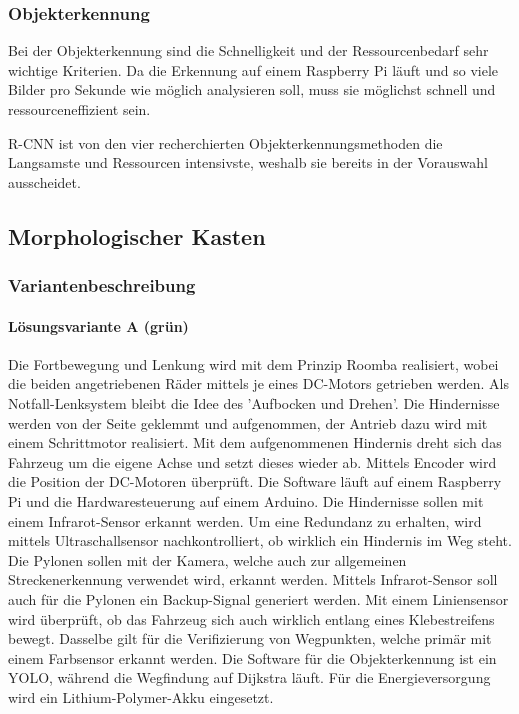 \documentclass[../main.tex]{subfiles}
\begin{document}
\subsubsection{Objekterkennung}

Bei der Objekterkennung sind die Schnelligkeit und der Ressourcenbedarf sehr wichtige Kriterien.
Da die Erkennung auf einem Raspberry Pi läuft und so viele Bilder pro Sekunde wie möglich analysieren soll, muss sie möglichst schnell und ressourceneffizient sein. 

R-CNN ist von den vier recherchierten Objekterkennungsmethoden die Langsamste und Ressourcen intensivste, weshalb sie bereits in der Vorauswahl ausscheidet.

\newpage
\subsection{Morphologischer Kasten}



    \subsubsection{Variantenbeschreibung}
    \paragraph{Lösungsvariante A (grün)}
    Die Fortbewegung und Lenkung wird mit dem Prinzip Roomba realisiert, wobei die beiden angetriebenen Räder mittels je eines DC-Motors getrieben werden. Als Notfall-Lenksystem bleibt die Idee des 'Aufbocken und Drehen'. Die Hindernisse werden von der Seite geklemmt und aufgenommen, der Antrieb dazu wird mit einem Schrittmotor realisiert. Mit dem aufgenommenen Hindernis dreht sich das Fahrzeug um die eigene Achse und setzt dieses wieder ab. Mittels Encoder wird die Position der DC-Motoren überprüft. Die Software läuft auf einem Raspberry Pi und die Hardwaresteuerung auf einem Arduino. Die Hindernisse sollen mit einem Infrarot-Sensor erkannt werden. Um eine Redundanz zu erhalten, wird mittels Ultraschallsensor nachkontrolliert, ob wirklich ein Hindernis im Weg steht. Die Pylonen sollen mit der Kamera, welche auch zur allgemeinen Streckenerkennung verwendet wird, erkannt werden. Mittels Infrarot-Sensor soll auch für die Pylonen ein Backup-Signal generiert werden. Mit einem Liniensensor wird überprüft, ob das Fahrzeug sich auch wirklich entlang eines Klebestreifens bewegt. Dasselbe gilt für die Verifizierung von Wegpunkten, welche primär mit einem Farbsensor erkannt werden. Die Software für die Objekterkennung ist ein YOLO, während die Wegfindung auf Dijkstra läuft. Für die Energieversorgung wird ein Lithium-Polymer-Akku eingesetzt.
\end{document}
